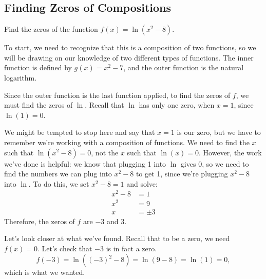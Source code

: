 \documentclass[nooutcomes]{ximera}
\begin{document}
\subsection{Finding Zeros of Compositions}
\begin{example}
Find the zeros of the function $f(x) = \ln(x^2 - 8)$.

\begin{explanation}
To start, we need to recognize that this is a composition of two functions, so we will be drawing on our knowledge of two different types of functions. The inner function is defined by $g(x) = x^2 - 7$, and the outer function is the natural logarithm. 

Since the outer function is the last function applied, to find the zeros of $f$, we must find the zeros of $\ln$. Recall that $\ln$ has only one zero, when $x = 1$, since $\ln(1) = 0$. 

We might be tempted to stop here and say that $x = 1$ is our zero, but we have to remember we're working with a composition of functions. We need to find the $x$ such that $\ln(x^2 - 8) = 0$, not the $x$ such that $\ln(x) = 0$. However, the work we've done is helpful: we know that plugging 1 into $\ln$ gives 0, so we need to find the numbers we can plug into $x^2 - 8$ to get 1, since we're plugging $x^2 - 8$ into $\ln$. To do this, we set $x^2 - 8 = 1$ and solve:
\begin{align*}
x^2 - 8 & = 1 \\
x^2 & = 9 \\
x & = \pm 3
\end{align*}
Therefore, the zeros of $f$ are $-3$ and $3$.

Let's look closer at what we've found. Recall that to be a zero, we need $f(x) = 0$. Let's check that $-3$ is in fact a zero. 
$$
f(-3) = \ln((-3)^2 - 8) = \ln(9 - 8) = \ln(1) = 0,
$$
which is what we wanted. 
\end{explanation}
\end{example}
\end{document}
